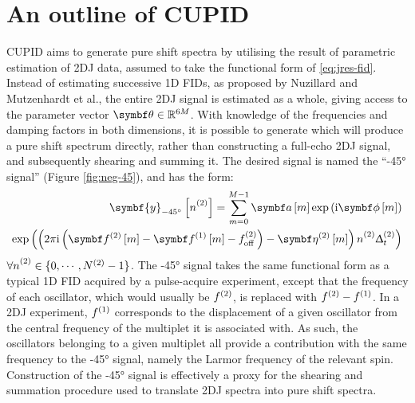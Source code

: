 \section{An outline of \acs{CUPID}}
\ac{CUPID} aims to generate pure shift spectra by utilising the result of
parametric estimation of \ac{2DJ} data, assumed to take the functional form of
\eqref{eq:jres-fid}.
Instead of estimating successive \ac{1D} \acp{FID}, as proposed by
Nuzillard and Mutzenhardt et al., the entire \ac{2DJ} signal is estimated as a
whole, giving access to the parameter vector $\bth \in \mathbb{R}^{6M}$. With
knowledge of the frequencies and damping factors in both dimensions, it is
possible to generate  which will produce a pure shift spectrum
directly, rather than constructing a full-echo \ac{2DJ} signal, and
subsequently shearing and summing it. The desired signal is named
the ``\ang{-45} signal'' (Figure
\ref{fig:neg-45}), and has the form:
\begin{equation}
    \begin{split}
        \symbf{y}_{\ang{-45}}\left[ \ntwo \right] =
            \sum_{m=0}^{M-1} \bdam \exp \left(\iu \bdphim \right)\\
            \exp\left(
                \left(
                    2 \pi \iu \left(\bdftwom - \bdfonem - \fofftwo\right)
                    - \bdetatwom
                \right) \ntwo \Dttwo
            \right)
    \end{split}
    \label{eq:neg-45}
\end{equation}
$\forall \ntwo \in \lbrace 0, \cdots, \Ntwo - 1 \rbrace$. The \ang{-45} signal
takes the same functional form as a typical \ac{1D}
\ac{FID} acquired by a pulse-acquire experiment, except that the frequency of
each oscillator, which would usually be $f^{(2)}$, is replaced with $f^{(2)} -
f^{(1)}$. In a \ac{2DJ} experiment, $f^{(1)}$ corresponds to the displacement of a
given oscillator from the central frequency of the multiplet it is associated
with. As such, the oscillators belonging to a given multiplet all provide
a contribution with the same frequency to the \ang{-45} signal, namely the
Larmor frequency of the relevant spin. Construction of the \ang{-45} signal is
effectively a proxy for the shearing and summation procedure used to translate
\ac{2DJ} spectra into pure shift spectra.
